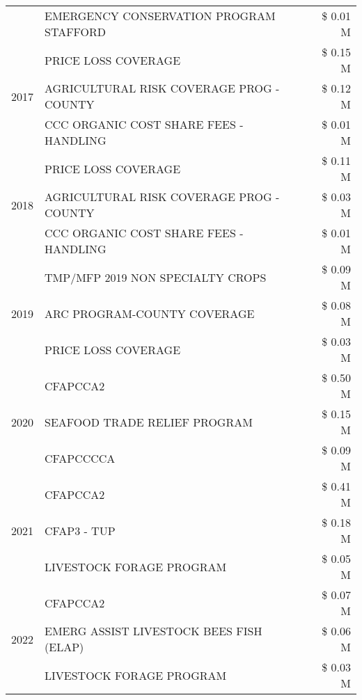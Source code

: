 \begin{tabular}{llr}
 & EMERGENCY CONSERVATION PROGRAM STAFFORD & \$ 0.01 M \\
\cline{1-3}
\multirow[t]{3}{*}{2017} & PRICE LOSS COVERAGE & \$ 0.15 M \\
 & AGRICULTURAL RISK COVERAGE PROG - COUNTY & \$ 0.12 M \\
 & CCC ORGANIC COST SHARE FEES - HANDLING & \$ 0.01 M \\
\cline{1-3}
\multirow[t]{3}{*}{2018} & PRICE LOSS COVERAGE & \$ 0.11 M \\
 & AGRICULTURAL RISK COVERAGE PROG - COUNTY & \$ 0.03 M \\
 & CCC ORGANIC COST SHARE FEES - HANDLING & \$ 0.01 M \\
\cline{1-3}
\multirow[t]{3}{*}{2019} & TMP/MFP 2019 NON SPECIALTY CROPS & \$ 0.09 M \\
 & ARC PROGRAM-COUNTY COVERAGE & \$ 0.08 M \\
 & PRICE LOSS COVERAGE & \$ 0.03 M \\
\cline{1-3}
\multirow[t]{3}{*}{2020} & CFAPCCA2 & \$ 0.50 M \\
 & SEAFOOD TRADE RELIEF PROGRAM & \$ 0.15 M \\
 & CFAPCCCCA & \$ 0.09 M \\
\cline{1-3}
\multirow[t]{3}{*}{2021} & CFAPCCA2 & \$ 0.41 M \\
 & CFAP3 - TUP & \$ 0.18 M \\
 & LIVESTOCK FORAGE PROGRAM & \$ 0.05 M \\
\cline{1-3}
\multirow[t]{3}{*}{2022} & CFAPCCA2 & \$ 0.07 M \\
 & EMERG ASSIST LIVESTOCK BEES FISH (ELAP) & \$ 0.06 M \\
 & LIVESTOCK FORAGE PROGRAM & \$ 0.03 M \\
\cline{1-3}
\bottomrule
\end{tabular}

